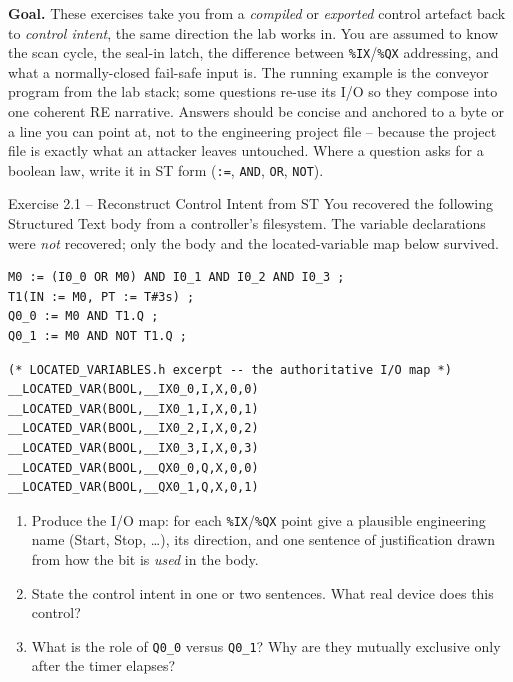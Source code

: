 \documentclass[11pt,a4paper]{article}
\begin{document}
\sheetheader

\noindent
\textbf{Goal.} These exercises take you from a \emph{compiled} or \emph{exported} control
artefact back to \emph{control intent}, the same direction the lab works in. You are assumed
to know the scan cycle, the seal-in latch, the difference between \texttt{\%IX}/\texttt{\%QX}
addressing, and what a normally-closed fail-safe input is. The running example is the conveyor
program from the lab stack; some questions re-use its I/O so they compose into one coherent RE
narrative. Answers should be concise and anchored to a byte or a line you can point at, not to
the engineering project file -- because the project file is exactly what an attacker leaves
untouched. Where a question asks for a boolean law, write it in ST form (\texttt{:=}, \texttt{AND},
\texttt{OR}, \texttt{NOT}).

\begin{taskbox}{Exercise 2.1 -- Reconstruct Control Intent from ST}
You recovered the following Structured Text body from a controller's filesystem. The variable
declarations were \emph{not} recovered; only the body and the located-variable map below survived.
\begin{lstlisting}
M0 := (I0_0 OR M0) AND I0_1 AND I0_2 AND I0_3 ;
T1(IN := M0, PT := T#3s) ;
Q0_0 := M0 AND T1.Q ;
Q0_1 := M0 AND NOT T1.Q ;
\end{lstlisting}
\begin{lstlisting}
(* LOCATED_VARIABLES.h excerpt -- the authoritative I/O map *)
__LOCATED_VAR(BOOL,__IX0_0,I,X,0,0)   __LOCATED_VAR(BOOL,__IX0_1,I,X,0,1)
__LOCATED_VAR(BOOL,__IX0_2,I,X,0,2)   __LOCATED_VAR(BOOL,__IX0_3,I,X,0,3)
__LOCATED_VAR(BOOL,__QX0_0,Q,X,0,0)   __LOCATED_VAR(BOOL,__QX0_1,Q,X,0,1)
\end{lstlisting}
\begin{enumerate}\setlength{\itemsep}{0pt}
  \item Produce the I/O map: for each \texttt{\%IX}/\texttt{\%QX} point give a plausible
        engineering name (Start, Stop, \ldots), its direction, and one sentence of justification
        drawn from how the bit is \emph{used} in the body.
  \item State the control intent in one or two sentences. What real device does this control?
  \item What is the role of \texttt{Q0\_0} versus \texttt{Q0\_1}? Why are they mutually exclusive
        only after the timer elapses?
\end{enumerate}
\end{taskbox}
\end{document}
